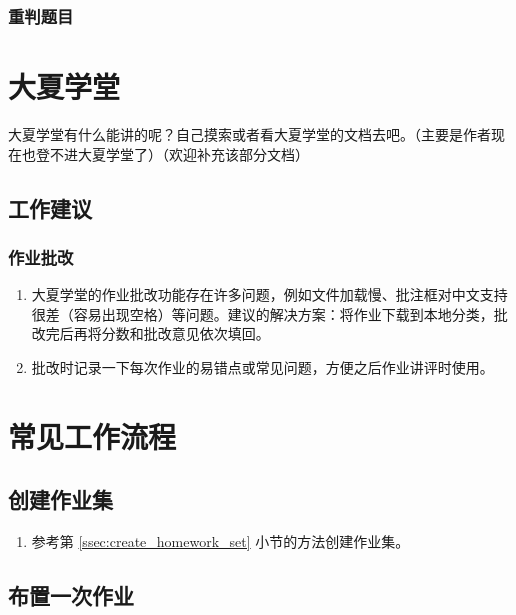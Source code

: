 \documentclass[oneside]{book}
\begin{document}
\subsection{重判题目}

\label{ssec:rejudge_problem}

\chapter{大夏学堂}

\label{chap:elearning}


大夏学堂有什么能讲的呢？自己摸索或者看大夏学堂的文档去吧。（主要是作者现在也登不进大夏学堂了）（欢迎补充该部分文档）

\section{工作建议}

\subsection{作业批改}

\begin{enumerate}
  \item 大夏学堂的作业批改功能存在许多问题，例如文件加载慢、批注框对中文支持很差（容易出现空格）等问题。建议的解决方案：将作业下载到本地分类，批改完后再将分数和批改意见依次填回。
  \item 批改时记录一下每次作业的易错点或常见问题，方便之后作业讲评时使用。
\end{enumerate}


\chapter{常见工作流程}

\label{chap:workflow}

\section{创建作业集}

\begin{enumerate}
  \item 参考第 \ref{ssec:create_homework_set} 小节的方法创建作业集。
\end{enumerate}

\section{布置一次作业}
\end{document}
